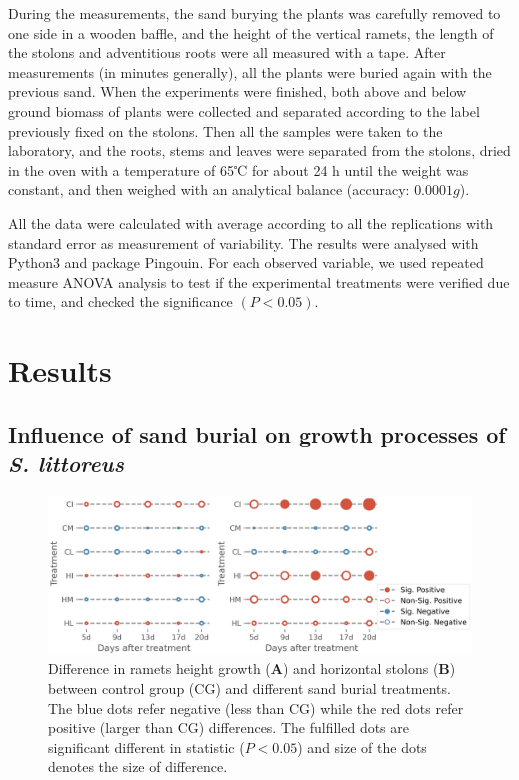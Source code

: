 \documentclass[]{interact}
\theoremstyle{plain}%
\theoremstyle{definition}
\theoremstyle{remark}
\begin{document}
During the measurements, the sand burying the plants was carefully removed to one side in a wooden baffle, and the height of the vertical ramets, the length of the stolons and adventitious roots were all measured with a tape. After measurements (in minutes generally), all the plants were buried again with the previous sand. When the experiments were finished, both above and below ground biomass of plants were collected and separated according to the label previously fixed on the stolons. Then all the samples were taken to the laboratory, and the roots, stems and leaves were separated from the stolons, dried in the oven with a temperature of 65℃ for about 24 h until the weight was constant, and then weighed with an analytical balance (accuracy: $0.0001g$).

All the data were calculated with average according to all the replications with standard error as measurement of variability. The results were analysed with Python3 and package Pingouin. For each observed variable, we used repeated measure ANOVA analysis to test if the experimental treatments were verified due to time, and checked the significance $(P<0.05)$.

\section{Results}

\subsection{Influence of sand burial on growth processes of \textit{S. littoreus}}

\begin{figure}[!h]
  \centering
  \includegraphics[scale=0.8]{../figs/grid_differences.jpg}
  \caption{
    Difference in ramets height growth (\textbf{A}) and horizontal stolons (\textbf{B}) between control group (CG) and different sand burial treatments. The blue dots refer negative (less than CG) while the red dots refer positive (larger than CG) differences. The fulfilled dots are significant different in statistic ($P<0.05$) and size of the dots denotes the size of difference.  
  } 
  \label{fig:lattice}
\end{figure}
\end{document}
